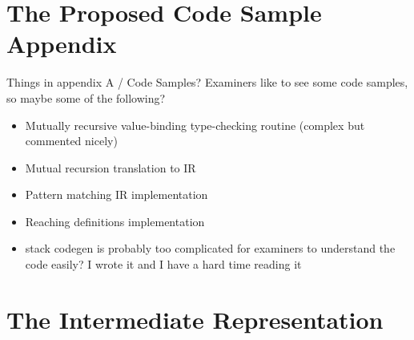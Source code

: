 \documentclass[12pt,twoside,notitlepage]{report}
\begin{document}
\chapter{The Proposed Code Sample Appendix}

Things in appendix A / Code Samples? Examiners like to see some code samples, so maybe some of the following?
\begin{itemize}
	\item Mutually recursive value-binding type-checking routine (complex but commented nicely)
	\item Mutual recursion translation to IR
	\item Pattern matching IR implementation
	\item Reaching definitions implementation
	\item stack codegen is probably too complicated for examiners to understand the code easily? I wrote it and I have a hard time reading it
\end{itemize}


\clearpage

\chapter{The Intermediate Representation}
\end{document}
